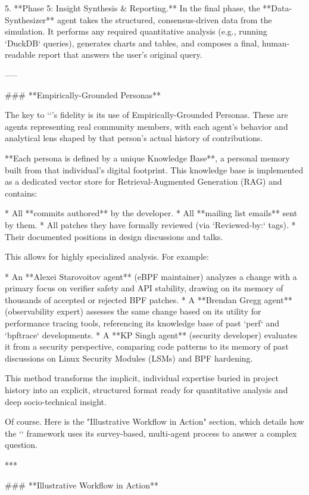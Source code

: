 5.  **Phase 5: Insight Synthesis & Reporting.** In the final phase, the **Data-Synthesizer** agent takes the structured, consensus-driven data from the simulation. It performs any required quantitative analysis (e.g., running `DuckDB` queries), generates charts and tables, and composes a final, human-readable report that answers the user's original query.

-----

### **Empirically-Grounded Personas**

The key to `\sys`'s fidelity is its use of Empirically-Grounded Personas. These are agents representing real community members, with each agent's behavior and analytical lens shaped by that person's actual history of contributions.

**Each persona is defined by a unique Knowledge Base**, a personal memory built from that individual's digital footprint. This knowledge base is implemented as a dedicated vector store for Retrieval-Augmented Generation (RAG) and contains:

  * All **commits authored** by the developer.
  * All **mailing list emails** sent by them.
  * All patches they have formally reviewed (via `Reviewed-by:` tags).
  * Their documented positions in design discussions and talks.

This allows for highly specialized analysis. For example:

  * An **Alexei Starovoitov agent** (eBPF maintainer) analyzes a change with a primary focus on verifier safety and API stability, drawing on its memory of thousands of accepted or rejected BPF patches.
  * A **Brendan Gregg agent** (observability expert) assesses the same change based on its utility for performance tracing tools, referencing its knowledge base of past `perf` and `bpftrace` developments.
  * A **KP Singh agent** (security developer) evaluates it from a security perspective, comparing code patterns to its memory of past discussions on Linux Security Modules (LSMs) and BPF hardening.

This method transforms the implicit, individual expertise buried in project history into an explicit, structured format ready for quantitative analysis and deep socio-technical insight.

Of course. Here is the "Illustrative Workflow in Action" section, which details how the `\sys` framework uses its survey-based, multi-agent process to answer a complex question.

***

### **Illustrative Workflow in Action**

